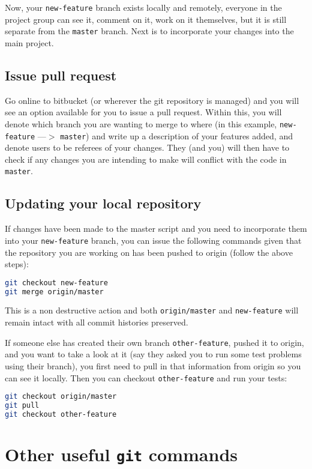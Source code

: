\documentclass[10pt]{article}
\begin{document}
Now, your \texttt{new-feature} branch exists locally and remotely, everyone in the project group can see it, comment on it, work on it themselves, but it is still separate from the \texttt{master} branch. Next is to incorporate your changes into the main project.

\subsection{Issue pull request}
Go online to bitbucket (or wherever the git repository is managed) and you will see an option available for you to issue a pull request. Within this, you will denote which branch you are wanting to merge to where (in this example, \texttt{new-feature} ---$>$ \texttt{master}) and write up a description of your features added, and denote users to be referees of your changes. They (and you) will then have to check if any changes you are intending to make will conflict with the code in \texttt{master}.

\subsection{Updating your local repository}

If changes have been made to the master script and you need to incorporate them into your \texttt{new-feature} branch, you can issue the following commands given that the repository you are working on has been pushed to origin (follow the above steps):
\begin{lstlisting}[language=bash]
git checkout new-feature
git merge origin/master
\end{lstlisting}
This is a non destructive action and both \texttt{origin/master} and \texttt{new-feature} will remain intact with all commit histories preserved.

If someone else has created their own branch \texttt{other-feature}, pushed it to origin, and you want to take a look at it (say they asked you to run some test problems using their branch), you first need to pull in that information from origin so you can see it locally. Then you can checkout \texttt{other-feature} and run your tests:

\begin{lstlisting}[language=bash]
git checkout origin/master
git pull
git checkout other-feature
\end{lstlisting}

\section{Other useful \texttt{git} commands}
\end{document}
